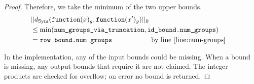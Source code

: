 \documentclass{article}
\begin{document}
\begin{proof}
    Therefore, we take the minimum of the two upper bounds.
    \begin{align*}
        &||d_{\mathrm{Sym}}(\texttt{function}(x)_{g}, \texttt{function}(x')_{g})||_0 \\
        &\le \min(\texttt{num\_groups\_via\_truncation}, \texttt{id\_bound.num\_groups}) \\
        &= \texttt{row\_bound.num\_groups} \hspace{2cm} \text{by line } \ref{line:num-groups}
    \end{align*}

    In the implementation, any of the input bounds could be missing.
    When a bound is missing, any output bounds that require it are not claimed. The integer products are checked for overflow; on error no bound is returned.
\end{proof}
\end{document}
